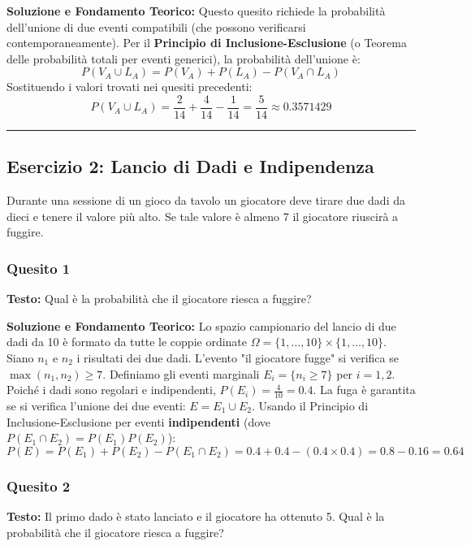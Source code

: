 \documentclass[12pt, a4paper]{article}
\begin{document}
\textbf{Soluzione e Fondamento Teorico:} 
Questo quesito richiede la probabilità dell'unione di due eventi compatibili (che possono verificarsi contemporaneamente). Per il \textbf{Principio di Inclusione-Esclusione} (o Teorema delle probabilità totali per eventi generici), la probabilità dell'unione è:
$$ P(V_A \cup L_A) = P(V_A) + P(L_A) - P(V_A \cap L_A) $$
Sostituendo i valori trovati nei quesiti precedenti:
$$ P(V_A \cup L_A) = \frac{2}{14} + \frac{4}{14} - \frac{1}{14} = \frac{5}{14} \approx 0.3571429 $$

\vspace{0.5cm}\hrule\vspace{0.5cm}

\subsection*{Esercizio 2: Lancio di Dadi e Indipendenza}
Durante una sessione di un gioco da tavolo un giocatore deve tirare due dadi da dieci e tenere il valore più alto. Se tale valore è almeno 7 il giocatore riuscirà a fuggire.

\subsubsection*{Quesito 1}
\textbf{Testo:} Qual è la probabilità che il giocatore riesca a fuggire?

\textbf{Soluzione e Fondamento Teorico:} 
Lo spazio campionario del lancio di due dadi da 10 è formato da tutte le coppie ordinate $\Omega = \{1,\dots,10\} \times \{1,\dots,10\}$.
Siano $n_1$ e $n_2$ i risultati dei due dadi. L'evento "il giocatore fugge" si verifica se $\max(n_1, n_2) \ge 7$. 
Definiamo gli eventi marginali $E_i = \{n_i \ge 7\}$ per $i=1,2$. Poiché i dadi sono regolari e indipendenti, $P(E_i) = \frac{4}{10} = 0.4$.
La fuga è garantita se si verifica l'unione dei due eventi: $E = E_1 \cup E_2$. Usando il Principio di Inclusione-Esclusione per eventi \textbf{indipendenti} (dove $P(E_1 \cap E_2) = P(E_1)P(E_2)$):
$$ P(E) = P(E_1) + P(E_2) - P(E_1 \cap E_2) = 0.4 + 0.4 - (0.4 \times 0.4) = 0.8 - 0.16 = 0.64 $$

\subsubsection*{Quesito 2}
\textbf{Testo:} Il primo dado è stato lanciato e il giocatore ha ottenuto 5. Qual è la probabilità che il giocatore riesca a fuggire?
\end{document}
